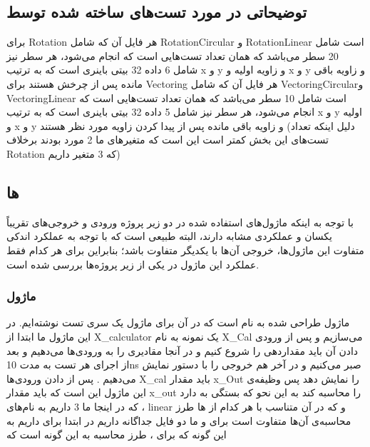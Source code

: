 \documentclass[12pt,titlepage,a4page , tikz , multi,table , svgnames,xcdraw]{article}
\begin{document}
\subsection{توضیحاتی در مورد تست‌های ساخته شده توسط }

برای Rotation هر فایل آن که شامل RotationCircular و RotationLinear است شامل 20 سطر می‌باشد که همان تعداد تست‌هایی است که انجام می‌شود، هر سطر نیز شامل 6 داده 32 بیتی باینری است که به ترتیب x و y و زاویه اولیه و x و y و زاویه باقی مانده پس از چرخش هستند
برای  Vectoring هر فایل آن که شامل VectoringCircularو VectoringLinear است شامل 10 سطر می‌باشد که همان تعداد تست‌هایی است که انجام می‌شود، هر سطر نیز شامل 5 داده 32 بیتی باینری است که به ترتیب x و y اولیه و x و y و زاویه باقی مانده پس از پیدا کردن زاویه مورد نظر هستند (دلیل اینکه تعداد تست‌های این بخش کمتر است این است که متغیرهای ما 2 مورد بودند برخلاف Rotation که 3 متغیر داریم)

\newpage


\subsection{  ها}

با توجه به اینکه ماژول‌های استفاده شده در دو زیر پروژه ورودی و خروجی‌های تقریباً یکسان و عملکردی مشابه دارند، البته طبیعی است که با توجه به عملکرد اندکی متفاوت این ماژول‌ها، خروجی آن‌ها با یکدیگر متفاوت باشد؛ بنابراین برای هر کدام فقط عملکرد این ماژول در یکی از زیر پروژه‌ها بررسی شده است.


\subsubsection{ماژول }


ماژول طراحی شده  به نام    است که در آن برای ماژول   یک سری تست نوشته‌ایم. در این ماژول ما ابتدا از X\_calculator  یک نمونه به نام X\_Cal  می‌سازیم و پس از ورودی دادن آن باید مقداردهی را شروع کنیم و در آنجا مقادیری را به ورودی‌ها می‌دهیم و بعد از اجرای هر تست به مدت 10ns  صبر می‌کنیم و در آخر هم خروجی را با  دستور   نمایش می‌دهیم . پس از  دادن ورودی‌ها X\_cal  باید مقدار x\_Out  را نمایش دهد پس وظیفه‌ی این ماژول این است که باید مقدار x\_out  را محاسبه کند به این نحو که بستگی به   دارد که در اینجا ما 3   داریم به نام‌های  ، linear   و  که در آن متناسب با هر کدام از   ها طرز محاسبه‌ی آن‌ها متفاوت است برای   و    ما دو فایل جداگانه داریم در ابتدا برای   داریم  به این گونه که  برای   ، طرز محاسبه به این گونه است که
\end{document}
